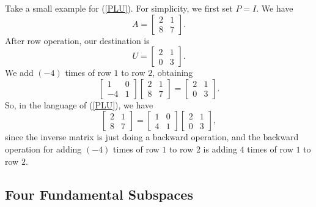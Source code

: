 \documentclass[11pt]{article}
\theoremstyle{break}
\theoremstyle{no_label}
\numberwithin{equation}{section}
\begin{document}
Take a small example for (\ref{PLU}). For simplicity, we first set $P=I$. We have $$A=\begin{bmatrix}
    2 & 1 \\ 8 & 7
\end{bmatrix}.$$ After row operation, our destination is $$U=\begin{bmatrix}
    2 & 1 \\ 0 & 3
\end{bmatrix}.$$
We add $(-4)$ times of row $1$ to row $2$, obtaining $$\begin{bmatrix}
    1 & 0 \\ -4 & 1
\end{bmatrix}\begin{bmatrix}
    2 & 1 \\ 8 & 7
\end{bmatrix}=\begin{bmatrix}
    2 & 1 \\ 0 & 3
\end{bmatrix}.$$ So, in the language of (\ref{PLU}), we have $$\begin{bmatrix}
    2 & 1 \\ 8 & 7
\end{bmatrix}=\begin{bmatrix}
    1 & 0 \\ 4 & 1
\end{bmatrix}\begin{bmatrix}
    2 & 1 \\ 0 & 3
\end{bmatrix},$$ since the inverse matrix is just doing a backward operation, and the backward operation for adding $(-4)$ times of row $1$ to row $2$ is adding $4$ times of row $1$ to row $2$.

\subsection{Four Fundamental Subspaces}
\end{document}
